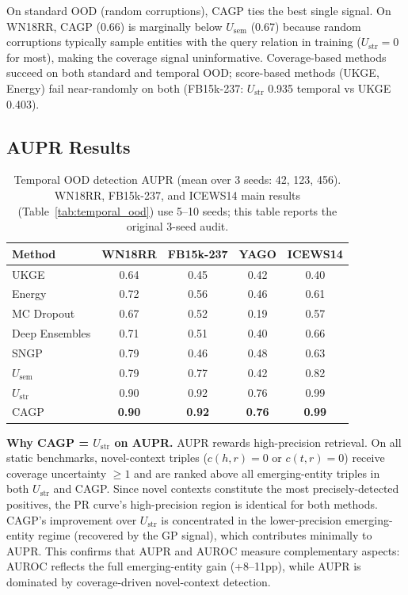 \documentclass{article}
\begin{document}
On standard OOD (random corruptions), CAGP ties the best single signal. On WN18RR, CAGP (0.66) is marginally below $U_{\text{sem}}$ (0.67) because random corruptions typically sample entities with the query relation in training ($U_{\text{str}}{=}0$ for most), making the coverage signal uninformative. Coverage-based methods succeed on both standard and temporal OOD; score-based methods (UKGE, Energy) fail near-randomly on both (FB15k-237: $U_{\text{str}}$ 0.935 temporal vs UKGE 0.403).

\subsection{AUPR Results}
\label{app:aupr}

\begin{table}[ht]
\centering
\caption{Temporal OOD detection AUPR (mean over 3 seeds: 42, 123, 456). WN18RR, FB15k-237, and ICEWS14 main results (Table~\ref{tab:temporal_ood}) use 5--10 seeds; this table reports the original 3-seed audit.}
\small
\begin{tabular}{lcccc}
\toprule
Method & WN18RR & FB15k-237 & YAGO & ICEWS14 \\
\midrule
UKGE & 0.64 & 0.45 & 0.42 & 0.40 \\
Energy & 0.72 & 0.56 & 0.46 & 0.61 \\
MC Dropout & 0.67 & 0.52 & 0.19 & 0.57 \\
Deep Ensembles & 0.71 & 0.51 & 0.40 & 0.66 \\
SNGP & 0.79 & 0.46 & 0.48 & 0.63 \\
\midrule
$U_{\text{sem}}$ & 0.79 & 0.77 & 0.42 & 0.82 \\
$U_{\text{str}}$ & 0.90 & 0.92 & 0.76 & 0.99 \\
CAGP & \textbf{0.90} & \textbf{0.92} & \textbf{0.76} & \textbf{0.99} \\
\bottomrule
\end{tabular}
\end{table}

\textbf{Why CAGP = $U_{\text{str}}$ on AUPR.} AUPR rewards high-precision retrieval. On all static benchmarks, novel-context triples ($c(h,r)=0$ or $c(t,r)=0$) receive coverage uncertainty $\geq 1$ and are ranked above all emerging-entity triples in both $U_{\text{str}}$ and CAGP. Since novel contexts constitute the most precisely-detected positives, the PR curve's high-precision region is identical for both methods. CAGP's improvement over $U_{\text{str}}$ is concentrated in the lower-precision emerging-entity regime (recovered by the GP signal), which contributes minimally to AUPR. This confirms that AUPR and AUROC measure complementary aspects: AUROC reflects the full emerging-entity gain (+8--11pp), while AUPR is dominated by coverage-driven novel-context detection.
\end{document}
